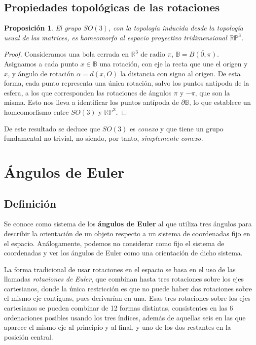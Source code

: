 \documentclass{article}
\theoremstyle{plain}
\newtheorem{proposition}{Proposición}
\theoremstyle{definition}
\theoremstyle{remark}
\begin{document}
\subsection{Propiedades topológicas de las rotaciones}
\begin{proposition}
  El grupo $SO(3)$, con la topología inducida desde la topología usual
  de las matrices, es homeomorfo al espacio proyectivo tridimensional
  $\mathbb{RP}^3$.
\end{proposition}
\begin{proof}
  Consideramos una bola cerrada en $\mathbb R^3$ de radio $\pi$,
  $\mathbb B = \overline{B(0, \pi)}$. Asignamos a cada punto $x \in \mathbb B$
  una rotación, con eje la recta que une el origen y $x$, y ángulo de
  rotación $\alpha = d(x, O)$ la distancia con signo al origen. De
  esta forma, cada punto representa una única rotación, salvo los
  puntos antípoda de la esfera, a los que corresponden las rotaciones de ángulos
  $\pi$ y $-\pi$, que son la misma. Esto nos lleva a identificar los
  puntos antípoda de $\partial \mathbb B$, lo que establece un
  homeomorfismo entre $SO(3)$ y $\mathbb{RP}^3$.
\end{proof}


De este resultado se deduce que $SO(3)$ es \textit{conexo} y que tiene un grupo
fundamental no trivial, no siendo, por tanto, \textit{simplemente conexo}.


\section{Ángulos de Euler}
\subsection{Definición}

Se conoce como sistema de los \textbf{ángulos de Euler} al que utiliza
tres ángulos para describir la orientación de un objeto respecto a un
sistema de coordenadas fijo en el espacio. Análogamente, podemos no
considerar como fijo el sistema de coordenadas y ver los ángulos de
Euler como una orientación de dicho sistema. %

La forma tradicional de usar rotaciones en el espacio se basa en el
uso de las llamadas \textit{rotaciones de Euler}, que combinan hasta tres
rotaciones sobre los ejes cartesianos, donde la única restricción es
que no puede haber dos rotaciones sobre el mismo eje contiguas, pues
derivarían en una. Esas tres rotaciones sobre los ejes cartesianos se
pueden combinar de 12 formas distintas, consistentes en las 6
ordenaciones posibles usando los tres índices, además de aquellas seis
en las que aparece el mismo eje al principio y al final, y uno de los
dos restantes en la posición central. %
\end{document}
